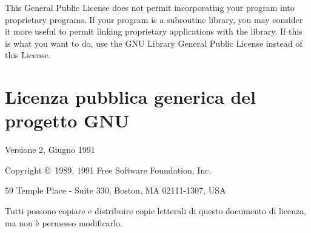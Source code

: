 This General Public License does not permit incorporating
your program into proprietary programs.  If your program is
a subroutine library, you may consider it more useful to
permit linking proprietary applications with the library.
If this is what you want to do, use the GNU Library General
Public License instead of this License.


\section{Licenza pubblica generica del progetto GNU}
\begin{center}
  \setlength{\parindent}{0in}
  Versione 2, Giugno 1991

  Copyright \copyright\ 1989, 1991 Free Software Foundation,
  Inc.

  \bigskip

  59 Temple Place - Suite 330, Boston, MA  02111-1307, USA

  \bigskip

  Tutti possono copiare e distribuire copie letterali di
  questo documento di licenza, ma non \`e permesso
  modificarlo.
\end{center}

